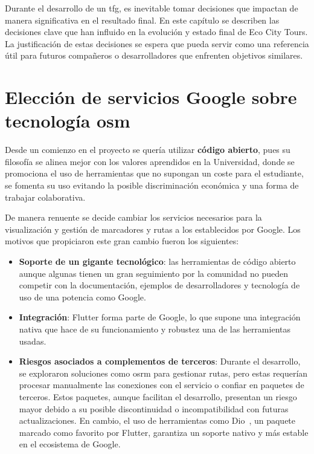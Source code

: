 
Durante el desarrollo de un \acrlong{tfg}, es inevitable tomar decisiones que impactan de manera significativa en el resultado final. En este capítulo se describen las decisiones clave que han influido en la evolución y estado final de Eco City Tours. La justificación de estas decisiones se espera que pueda servir como una referencia útil para futuros compañeros o desarrolladores que enfrenten objetivos similares. 

\section{Elección de servicios Google sobre tecnología \acrlong{osm}}

Desde un comienzo en el proyecto se quería utilizar \textbf{código abierto}, pues su filosofía se alinea mejor con los valores aprendidos en la Universidad, donde se promociona el uso de herramientas que no supongan un coste para el estudiante, se fomenta su uso evitando la posible discriminación económica y una forma de trabajar colaborativa.

De manera renuente se decide cambiar los servicios necesarios para la visualización y gestión de marcadores y rutas a los establecidos por Google. Los motivos que propiciaron este gran cambio fueron los siguientes:
\begin{itemize}
	\item \textbf{Soporte de un gigante tecnológico}: las herramientas de código abierto aunque algunas tienen un gran seguimiento por la comunidad no pueden competir con la documentación, ejemplos de desarrolladores y tecnología de uso de una potencia como Google.
	\item \textbf{Integración}: Flutter forma parte de Google, lo que supone una integración nativa que hace de su funcionamiento y robustez una de las herramientas usadas.
	\item \textbf{Riesgos asociados a complementos de terceros}: Durante el desarrollo, se exploraron soluciones como \acrfull{osrm} para gestionar rutas, pero estas requerían procesar manualmente las conexiones con el servicio o confiar en paquetes de terceros. Estos paquetes, aunque facilitan el desarrollo, presentan un riesgo mayor debido a su posible discontinuidad o incompatibilidad con futuras actualizaciones. En cambio, el uso de herramientas como Dio~\cite{dio_package}, un paquete marcado como favorito por Flutter, garantiza un soporte nativo y más estable en el ecosistema de Google.
\end{itemize} 

